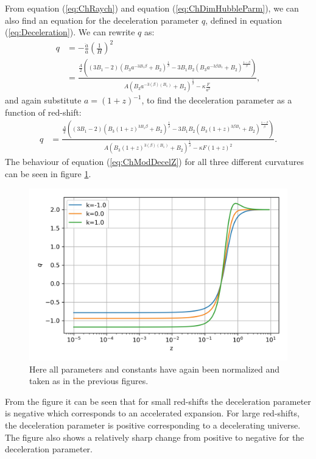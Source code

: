 \documentclass[a4paper, 11pt]{FSKH_623_Report}
\numberwithin{equation}{section}
\newcommand{\brac}[1]{\left(#1\right)}
\begin{document}
From equation (\ref{eq:ChRaych}) and equation (\ref{eq:ChDimHubbleParm}), we can also find an equation for the deceleration parameter $q$, defined in equation (\ref{eq:Deceleration}). We can rewrite $q$ as:
\begin{equation}\label{eq:ChModDecel}
\begin{split}
q &= -\frac{\ddot{a}}{a}\brac{\frac{1}{H}}^{2}         \\
&= \frac{\frac{A}{2}\brac{\brac{3B_{1}-2}\brac{B_{3}a^{-3B_{1}\beta}+B_{2}}^{\frac{1}{\beta}}-3B_{1}B_{2}\brac{B_{3}a^{-3\beta B_{1}}+B_{2}}^{\frac{1-\beta}{\beta}}}}{A\brac{B_{3}a^{-3\brac{\beta}\brac{B_{1}}}+B_{2}}^{\frac{1}{\beta}} -\kappa\frac{F}{a^{2}}},
\end{split}
\end{equation}
and again substitute $a=\brac{1+z}^{-1}$, to find the deceleration parameter as a function of red-shift:
\begin{equation}\label{eq:ChModDecelZ}
\begin{split}
q &= \frac{\frac{A}{2}\brac{\brac{3B_{1}-2}\brac{B_{3}\brac{1+z}^{3B_{1}\beta}+B_{2}}^{\frac{1}{\beta}}-3B_{1}B_{2}\brac{B_{3}\brac{1+z}^{3\beta B_{1}}+B_{2}}^{\frac{1-\beta}{\beta}}}}{A\brac{B_{3}\brac{1+z}^{3\brac{\beta}\brac{B_{1}}}+B_{2}}^{\frac{1}{\beta}} -\kappa F\brac{1+z}^{2}}.
\end{split}
\end{equation}
The behaviour of equation (\ref{eq:ChModDecelZ}) for all three different curvatures can be seen in figure \ref{fig:ChDecel}. 
\begin{figure}[H]
\centering
\includegraphics[scale=0.8]{Figures/ch_q.jpg}
\caption{Here all parameters and constants have again been normalized and taken as in the previous figures.}
\label{fig:ChDecel}
\end{figure}
From the figure it can be seen that for small red-shifts the deceleration parameter is negative which corresponds to an accelerated expansion. For large red-shifts, the deceleration parameter is positive corresponding to a decelerating universe. The figure also shows a relatively sharp change from positive to negative for the deceleration parameter.
\end{document}
